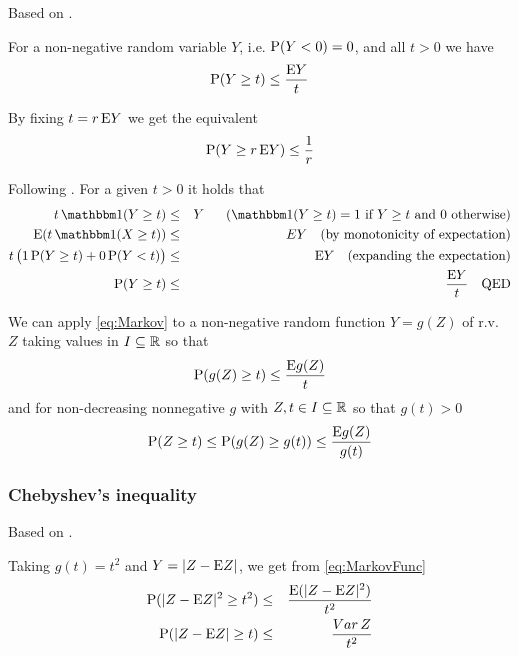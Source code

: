 Based on \cite{Casella2002}.

For a non-negative random variable $Y$, i.e. $\mathrm{P}(Y < 0) = 0$, and all $t > 0$ we have
\begin{equation}\label{eq:Markov}
\mathrm{P}(Y \geq t) \leq \frac{\mathrm{E} Y}{t}
\end{equation}

By fixing $t = r \, \mathrm{E} Y$ we get the equivalent
\begin{equation}
\mathrm{P}(Y \geq r \, \mathrm{E} Y) \leq \frac{1}{r}
\end{equation}

\begin{prf}
Following \cite{Casella2002}. For a given $t > 0$ it holds that 
\begin{eqnarray*}
t \, \ind(Y \geq t) & \leq & Y \ \quad \ (\ind(Y \geq t) = 1 \text{ if } Y \geq t \text{ and 0 otherwise})\\
\rE (t \,\ind(X \geq t)) & \leq & E Y \quad \text{(by monotonicity of expectation)} \\
t \, \big( 1 \, \rP(Y \geq t) + 0 \, \rP(Y < t) \big) & \leq & \rE Y  \quad \text{(expanding the expectation)} \\
\rP(Y \geq t) & \leq & \frac{\rE Y}{t} \quad \text{QED}
\end{eqnarray*}
\end{prf}

We can apply \eqref{eq:Markov} to a non-negative random function $Y = g(Z)$ of r.v. $Z$ taking values in $I \subseteq \mathbb{R}$ so that 
\begin{equation}
\mathrm{P}(g(Z) \geq t) \leq \frac{\mathrm{E} g(Z)}{t}
\end{equation}
and for non-decreasing nonnegative $g$ with $Z, t \in I \subseteq \mathbb{R}$ so that $g(t) > 0$
\begin{equation}\label{eq:MarkovFunc}
\mathrm{P}(Z \geq t) \leq \mathrm{P}(g(Z) \geq g(t)) \leq \frac{\mathrm{E} g(Z)}{g(t)}
\end{equation}

\subsubsection{Chebyshev's inequality}

Based on \cite{Boucheron2013}.

Taking $g(t) = t^2$ and $Y = |Z - \mathrm{E}{Z}|$, we get from \eqref{eq:MarkovFunc}
\begin{eqnarray}\label{eq:Chebyshev}
\mathrm{P}(|Z - \mathrm{E}{Z}|^2 \geq t^2) & \leq & \frac{\mathrm{E} (|Z - \mathrm{E}{Z}|^2)}{t^2} \nonumber \\
\mathrm{P}(|Z - \mathrm{E}{Z}| \geq t) & \leq & \frac{Var \, Z}{t^2}
\end{eqnarray}

